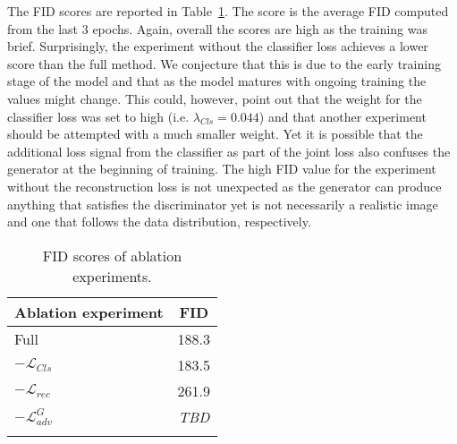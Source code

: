 \documentclass[a4paper,12pt]{report}
\begin{document}
The FID scores are reported in Table~\ref{tab:ablation_fid}. The score is the average FID computed from the last 3 epochs. Again, overall the scores are high as the training was brief. Surprisingly, the experiment without the classifier loss achieves a lower score than the full method. We conjecture that this is due to the early training stage of the model and that as the model matures with ongoing training the values might change. This could, however, point out that the weight for the classifier loss was set to high (i.e. $\lambda_{Cls} = 0.044$) and that another experiment should be attempted with a much smaller weight. Yet it is possible that the additional loss signal from the classifier as part of the joint loss also confuses the generator at the beginning of training. The high FID value for the experiment without the reconstruction loss is not unexpected as the generator can produce anything that satisfies the discriminator yet is not necessarily a realistic image and one that follows the data distribution, respectively.
\begin{table}[ht!]
\centering
\begin{tabular}{l c}
\Xhline{0.8pt}
\textbf{Ablation experiment} & \textbf{FID} \\
\hline
Full & 188.3 \\ %
$-\mathcal{L}_{Cls}$ & 183.5 \\ %
$-\mathcal{L}_{rec}$ & 261.9 \\ %
$-\mathcal{L}^G_{adv}$ & \textit{TBD} \\ %
\Xhline{0.8pt}
\end{tabular}
\caption{FID scores of ablation experiments.} \label{tab:ablation_fid}
\end{table}

% 
% 	
% 
\end{document}

